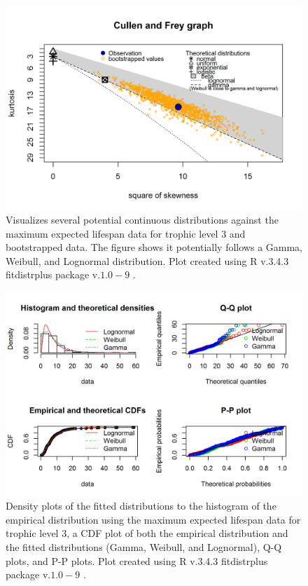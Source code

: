 \documentclass[oneside,12pt,final]{sty/ucthesis-CA2012}
\let\cite\citep                             %
\begin{document}
\begin{mainmatter}
\begin{figure}[H]
     \centering
       \includegraphics[width=.8\textwidth]{fig/cullen_frey_l3}
    \caption{Visualizes several potential continuous distributions against the maximum expected lifespan data for trophic level 3 and bootstrapped data. The figure shows it potentially follows a Gamma, Weibull, and Lognormal distribution. Plot created using R v.3.4.3 \cite{Rcite} fitdistrplus package v.$1.0-9$ \cite{fitdistrplus}. }
    \label{cf_l3}
\end{figure}

\begin{figure}[H]
     \centering
       \includegraphics[width=.8\textwidth]{fig/gof_l3}
    \caption{Density plots of the fitted distributions to the histogram of the empirical distribution using the maximum expected lifespan data for trophic level 3, a CDF plot of both the empirical distribution and the fitted distributions (Gamma, Weibull, and Lognormal), Q-Q plots, and P-P plots. Plot created using R v.3.4.3 \cite{Rcite} fitdistrplus package v.$1.0-9$ \cite{fitdistrplus}. }
    \label{gof_l3}
\end{figure}


\end{mainmatter}
\end{document}
